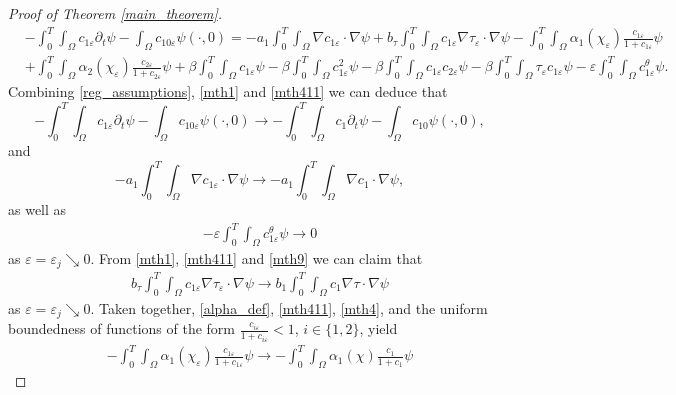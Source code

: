 \documentclass[a4paper,10pt]{article}
\theoremstyle{definition}
\begin{document}
\begin{proof}[Proof of Theorem \ref{main_theorem}]
\begin{align}
   \label{mthdefeq1}
  \nonumber  & - \int_0^T \int_\Omega c_{1\varepsilon} \partial_t \psi - \int_\Omega c_{10\varepsilon} \psi(\cdot, 0) = - a_1 \int_0^T \int_\Omega \nabla c_{1\varepsilon} \cdot \nabla \psi + b_\tau \int_0^T \int_\Omega c_{1\varepsilon} \nabla \tau_\varepsilon \cdot \nabla \psi - \int_0^T \int_\Omega \alpha_1(\chi_\varepsilon )\tfrac{c_{1\varepsilon}}{1 + c_{1\varepsilon}} \psi \\[5pt]
  & + \int_0^T \int_\Omega \alpha_2(\chi_\varepsilon )\tfrac{c_{2\varepsilon}}{1 + c_{2\varepsilon}} \psi + \beta \int_0^T \int_\Omega c_{1\varepsilon} \psi - \beta \int_0^T \int_\Omega  c_{1\varepsilon}^2 \psi - \beta \int_0^T \int_\Omega  c_{1\varepsilon} c_{2\varepsilon} \psi - \beta \int_0^T \int_\Omega \tau_\varepsilon c_{1\varepsilon}\psi - \varepsilon \int_0^T \int_\Omega c_{1\varepsilon}^\theta \psi.
\end{align}
Combining \eqref{reg_assumptions}, \eqref{mth1} and \eqref{mth411} we can deduce that
\begin{equation}
  \label{weak_sol1}
  - \int_0^T \int_\Omega c_{1\varepsilon} \partial_t \psi - \int_\Omega c_{10\varepsilon} \psi(\cdot, 0) \to - \int_0^T \int_\Omega c_{1} \partial_t \psi - \int_\Omega c_{10} \psi(\cdot, 0),
\end{equation}
and
\begin{equation}
\label{weak_sol2}
 - a_1 \int_0^T \int_\Omega \nabla c_{1\varepsilon} \cdot \nabla \psi \to  - a_1 \int_0^T \int_\Omega \nabla c_{1} \cdot \nabla \psi,
\end{equation}
as well as
\begin{align}
\label{weak_sol3}
 - \varepsilon \int_0^T \int_\Omega c_{1\varepsilon}^\theta \psi \to 0
\end{align}
as $\varepsilon = \varepsilon_j \searrow 0$.
From \eqref{mth1}, \eqref{mth411} and \eqref{mth9} we can claim that
\begin{align}
\label{weak_sol4}
 b_\tau \int_0^T \int_\Omega c_{1\varepsilon} \nabla \tau_\varepsilon \cdot \nabla \psi \to b_1 \int_0^T \int_\Omega c_{1} \nabla \tau \cdot \nabla \psi
\end{align}
as $\varepsilon = \varepsilon_j \searrow 0$. Taken together, \eqref{alpha_def}, \eqref{mth411}, \eqref{mth4}, and the uniform boundedness of functions of the form $\frac{c_{i\varepsilon}}{1 + c_{i\varepsilon}} < 1$, $i \in \{1, 2\}$, yield
\begin{align}
 \label{weak_sol6}
 - \int_0^T \int_\Omega \alpha_1(\chi_\varepsilon )\frac{c_{1\varepsilon}}{1 +  c_{1\varepsilon}} \psi \to - \int_0^T \int_\Omega \alpha_1(\chi)\frac{c_{1}}{1 +  c_{1}} \psi

\end{align}
\end{proof}
\end{document}
